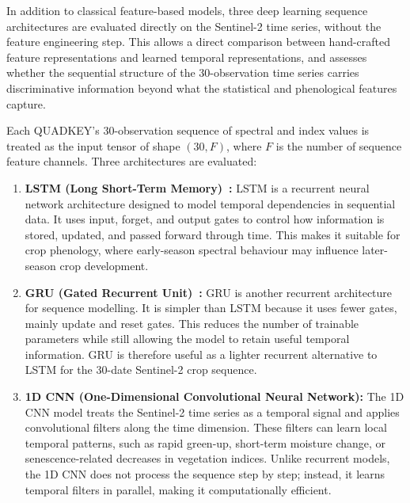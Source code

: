 In addition to classical feature-based models, three deep learning
sequence architectures are evaluated directly on the Sentinel-2 time
series, without the feature engineering step. This allows a direct
comparison between hand-crafted feature representations and learned
temporal representations, and assesses whether the sequential structure
of the 30-observation time series carries discriminative information
beyond what the statistical and phenological features capture.

Each QUADKEY's 30-observation sequence of spectral and index values is
treated as the input tensor of shape $(30, F)$, where $F$ is the number
of sequence feature channels. Three architectures are evaluated:

\begin{enumerate}
    \item \textbf{LSTM (Long Short-Term Memory)~\cite{hochreiter1997}:}
          LSTM is a recurrent neural network architecture designed to model
          temporal dependencies in sequential data. It uses input, forget,
          and output gates to control how information is stored, updated, and
          passed forward through time. This makes it suitable for crop
          phenology, where early-season spectral behaviour may influence
          later-season crop development.

    \item \textbf{GRU (Gated Recurrent Unit)~\cite{cho2014}:}
          GRU is another recurrent architecture for sequence modelling. It is
          simpler than LSTM because it uses fewer gates, mainly update and
          reset gates. This reduces the number of trainable parameters while
          still allowing the model to retain useful temporal information. GRU
          is therefore useful as a lighter recurrent alternative to LSTM for
          the 30-date Sentinel-2 crop sequence.

    \item \textbf{1D CNN (One-Dimensional Convolutional Neural Network):}
          The 1D CNN model treats the Sentinel-2 time series as a temporal
          signal and applies convolutional filters along the time dimension.
          These filters can learn local temporal patterns, such as rapid
          green-up, short-term moisture change, or senescence-related
          decreases in vegetation indices. Unlike recurrent models, the 1D
          CNN does not process the sequence step by step; instead, it learns
          temporal filters in parallel, making it computationally efficient.
\end{enumerate}

